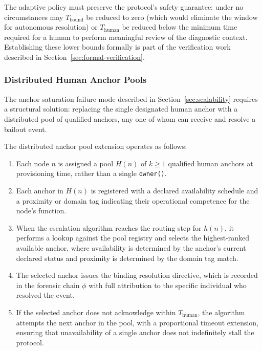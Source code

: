 The adaptive policy must preserve the protocol's safety guarantee: under no circumstances may $T_{\text{bound}}$ be reduced to zero (which would eliminate the window for autonomous resolution) or $T_{\text{human}}$ be reduced below the minimum time required for a human to perform meaningful review of the diagnostic context. Establishing these lower bounds formally is part of the verification work described in Section~\ref{sec:formal-verification}.

\subsubsection{Distributed Human Anchor Pools}\label{sec:distributed-anchors}

The anchor saturation failure mode described in Section~\ref{sec:scalability} requires a structural solution: replacing the single designated human anchor with a distributed pool of qualified anchors, any one of whom can receive and resolve a bailout event.

The distributed anchor pool extension operates as follows:

\begin{enumerate}\setlength\itemsep{0.25em}
\item Each node $n$ is assigned a pool $H(n)$ of $k \geq 1$ qualified human anchors at provisioning time, rather than a single \texttt{owner()}.
\item Each anchor in $H(n)$ is registered with a declared availability schedule and a proximity or domain tag indicating their operational competence for the node's function.
\item When the escalation algorithm reaches the routing step for $h(n)$, it performs a lookup against the pool registry and selects the highest-ranked available anchor, where availability is determined by the anchor's current declared status and proximity is determined by the domain tag match.
\item The selected anchor issues the binding resolution directive, which is recorded in the forensic chain $\phi$ with full attribution to the specific individual who resolved the event.
\item If the selected anchor does not acknowledge within $T_{\text{human}}$, the algorithm attempts the next anchor in the pool, with a proportional timeout extension, ensuring that unavailability of a single anchor does not indefinitely stall the protocol.
\end{enumerate}


